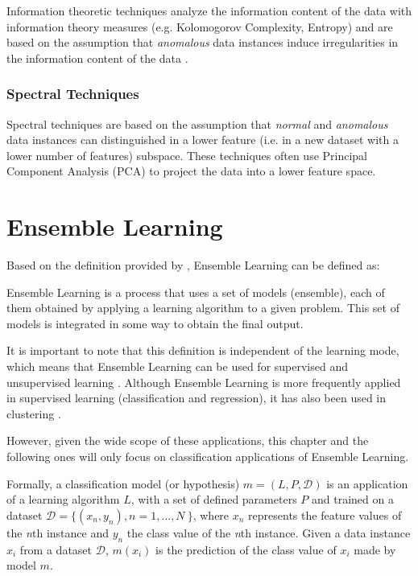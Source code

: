 Information theoretic techniques analyze the information content of the data with information theory measures (e.g. Kolomogorov Complexity, Entropy) and are based on the assumption that \textit{anomalous} data instances induce irregularities in the information content of the data \cite{Kandhari2009}.

\subsubsection{Spectral Techniques}

Spectral techniques are based on the assumption that \textit{normal} and \textit{anomalous} data instances can distinguished in a lower feature (i.e. in a new	 dataset with a lower number of features) subspace. These techniques often use Principal Component Analysis (PCA) \cite{Jolliffe2002} to project the data into a lower feature space.

\section{Ensemble Learning}\label{sec:ensemble}


Based on the definition provided by \textcite{Mendes-Moreira2012}, Ensemble Learning can be defined as: 

\begin{definition} \label{def:ensemble_learning}
	Ensemble Learning is a process that uses a set of models (ensemble), each of them obtained by applying a learning algorithm to a given problem. This set of models is integrated in some way to obtain the final output.
\end{definition}

It is important to note that this definition is independent of the learning mode, which means that Ensemble Learning can be used for supervised and unsupervised learning \cite{Mendes-Moreira2012}.
Although Ensemble Learning is more frequently applied in supervised learning (classification and regression), it has also been used in clustering \cite{Strehl:2003:CEK:944919.944935}.

However, given the wide scope of these applications, this chapter and the following ones will only focus on classification applications of Ensemble Learning.

Formally, a classification model (or hypothesis) $m = (L, P, \mathcal{D})$ is an application of a learning algorithm $L$, with a set of defined parameters $P$ and trained on a dataset $\mathcal{D} = \{(x_n, y_n), n = 1, \dots, N\ \}$, where $x_n$ represents the feature values of the \textit{n}th instance and $y_n$ the class value of the \textit{n}th instance.
Given a data instance $x_i$ from a dataset $\mathcal{D}$, $m(x_i)$ is the prediction of the class value of $x_i$ made by model $m$.

